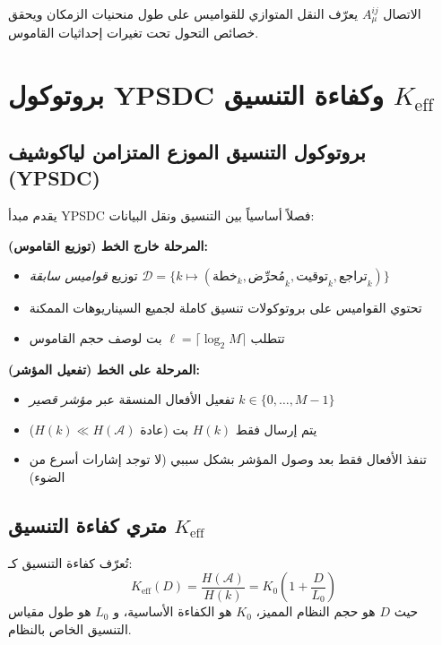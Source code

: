 \documentclass[11pt,a4paper]{article}
\begin{document}
	الاتصال $A_\mu^{ij}$ يعرّف النقل المتوازي للقواميس على طول منحنيات الزمكان ويحقق خصائص التحول تحت تغيرات إحداثيات القاموس.
	
	\section{بروتوكول YPSDC وكفاءة التنسيق \texorpdfstring{$K_{\mathrm{eff}}$}{K_eff}}
	
	\subsection{بروتوكول التنسيق الموزع المتزامن لياكوشيف (YPSDC)}
	يقدم مبدأ YPSDC فصلاً أساسياً بين التنسيق ونقل البيانات:
	
	\begin{tcolorbox}[title=مبدأ YPSDC, colback=blue!5!white, colframe=blue!50!black]
		\textbf{المرحلة خارج الخط (توزيع القاموس):}
		\begin{itemize}
			\item توزيع \emph{قواميس سابقة} $\mathcal{D} = \{k \mapsto (\text{خطة}_k, \text{مُحرِّض}_k, \text{توقيت}_k, \text{تراجع}_k)\}$
			\item تحتوي القواميس على بروتوكولات تنسيق كاملة لجميع السيناريوهات الممكنة
			\item تتطلب $\ell = \lceil \log_2 M \rceil$ بت لوصف حجم القاموس
		\end{itemize}
		
		\textbf{المرحلة على الخط (تفعيل المؤشر):}
		\begin{itemize}
			\item تفعيل الأفعال المنسقة عبر \emph{مؤشر قصير} $k \in \{0, \dots, M-1\}$
			\item يتم إرسال فقط $H(k)$ بت (عادة $H(k) \ll H(\mathcal{A})$)
			\item تنفذ الأفعال فقط بعد وصول المؤشر بشكل سببي (لا توجد إشارات أسرع من الضوء)
		\end{itemize}
	\end{tcolorbox}
	
	\subsection{متري كفاءة التنسيق \texorpdfstring{$K_{\mathrm{eff}}$}{K_eff}}
	تُعرّف كفاءة التنسيق كـ:
	\begin{equation}
		K_{\mathrm{eff}}(D) = \frac{H(\mathcal{A})}{H(k)} = K_0 \left(1 + \frac{D}{L_0}\right)
	\end{equation}
	حيث $D$ هو حجم النظام المميز، $K_0$ هو الكفاءة الأساسية، و $L_0$ هو طول مقياس التنسيق الخاص بالنظام.
	
\end{document}
